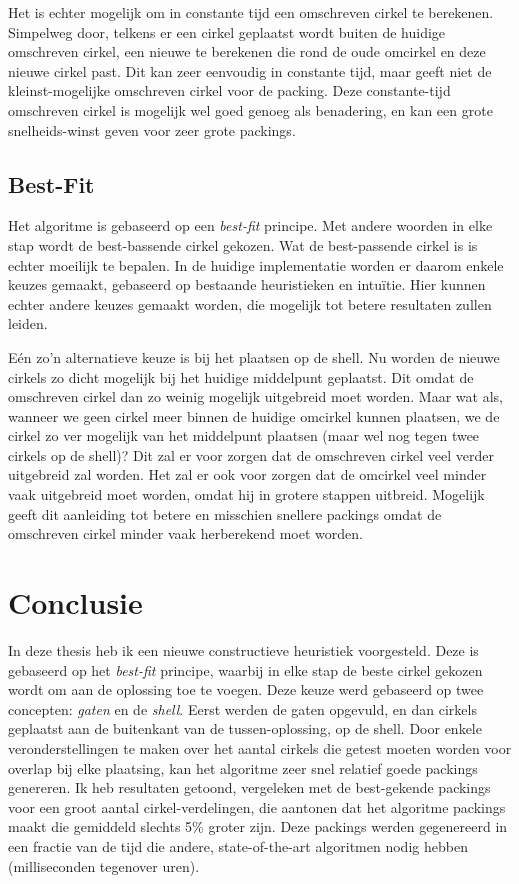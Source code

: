 \documentclass[12pt,a4paper,oneside]{book}
\begin{document}
Het is echter mogelijk om in constante tijd een omschreven cirkel te berekenen.
Simpelweg door, telkens er een cirkel geplaatst wordt buiten de huidige omschreven cirkel, een nieuwe te berekenen die rond de oude omcirkel en deze nieuwe cirkel past.
Dit kan zeer eenvoudig in constante tijd, maar geeft niet de kleinst-mogelijke omschreven cirkel voor de packing.
Deze constante-tijd omschreven cirkel is mogelijk wel goed genoeg als benadering, en kan een grote snelheids-winst geven voor zeer grote packings.

\section{Best-Fit}

Het algoritme is gebaseerd op een \textit{best-fit} principe.
Met andere woorden in elke stap wordt de best-bassende cirkel gekozen.
Wat de best-passende cirkel is is echter moeilijk te bepalen.
In de huidige implementatie worden er daarom enkele keuzes gemaakt, gebaseerd op bestaande heuristieken en intuïtie.
Hier kunnen echter andere keuzes gemaakt worden, die mogelijk tot betere resultaten zullen leiden.

Eén zo'n alternatieve keuze is bij het plaatsen op de shell.
Nu worden de nieuwe cirkels zo dicht mogelijk bij het huidige middelpunt geplaatst.
Dit omdat de omschreven cirkel dan zo weinig mogelijk uitgebreid moet worden.
Maar wat als, wanneer we geen cirkel meer binnen de huidige omcirkel kunnen plaatsen, we de cirkel zo ver mogelijk van het middelpunt plaatsen (maar wel nog tegen twee cirkels op de shell)?
Dit zal er voor zorgen dat de omschreven cirkel veel verder uitgebreid zal worden.
Het zal er ook voor zorgen dat de omcirkel veel minder vaak uitgebreid moet worden, omdat hij in grotere stappen uitbreid.
Mogelijk geeft dit aanleiding tot betere en misschien snellere packings omdat de omschreven cirkel minder vaak herberekend moet worden.

\chapter{Conclusie} \label{chap:conclusie}

In deze thesis heb ik een nieuwe constructieve heuristiek voorgesteld.
Deze is gebaseerd op het \textit{best-fit} principe, waarbij in elke stap de beste cirkel gekozen wordt om aan de oplossing toe te voegen.
Deze keuze werd gebaseerd op twee concepten: \textit{gaten} en de \textit{shell}.
Eerst werden de gaten opgevuld, en dan cirkels geplaatst aan de buitenkant van de tussen-oplossing, op de shell.
Door enkele veronderstellingen te maken over het aantal cirkels die getest moeten worden voor overlap bij elke plaatsing, kan het algoritme zeer snel relatief goede packings genereren.
Ik heb resultaten getoond, vergeleken met de best-gekende packings voor een groot aantal cirkel-verdelingen, die aantonen dat het algoritme packings maakt die gemiddeld slechts 5\% groter zijn.
Deze packings werden gegenereerd in een fractie van de tijd die andere, state-of-the-art algoritmen nodig hebben (milliseconden tegenover uren).
\end{document}
